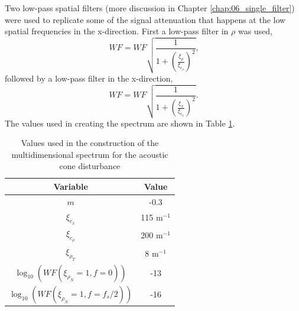 Two low-pass spatial filters (more discussion in Chapter \ref{chap:06_single_filter}) were used to replicate some of the signal attenuation that happens at the low spatial frequencies in the x-direction.
First a low-pass filter in $\rho$ was used,
\begin{equation}
  WF = WF\sqrt{\frac{1}{1+\left(\frac{\xi_\rho}{\xi_{c_\rho}}\right)^2}} \textrm{,}
\end{equation}
followed by a low-pass filter in the x-direction,
\begin{equation}
  WF = WF\sqrt{\frac{1}{1+\left(\frac{\xi_x}{\xi_{c_x}}\right)^2}} \textrm{.}
\end{equation}
The values used in creating the spectrum are shown in Table \ref{tab:05_cone}.
\begin{table}
  \centering
  \caption{Values used in the construction of the multidimensional spectrum for the acoustic cone disturbance}
  \begin{tabular}{c c}
    Variable & Value \\
    \hline \hline
    $m$ & -0.3 \\
    $\xi_{c_x}$ & 115 m$^{-1}$ \\
    $\xi_{c_\rho}$ & 200 m$^{-1}$ \\
    $\xi_{\rho_T}$ & 8 m$^{-1}$ \\
    $\log_{10}(WF(\xi_{\rho_N}=1,f=0))$ & -13 \\
    $\log_{10}(WF(\xi_{\rho_N}=1,f=f_s/2))$ & -16
  \end{tabular}
  \label{tab:05_cone}
\end{table}

